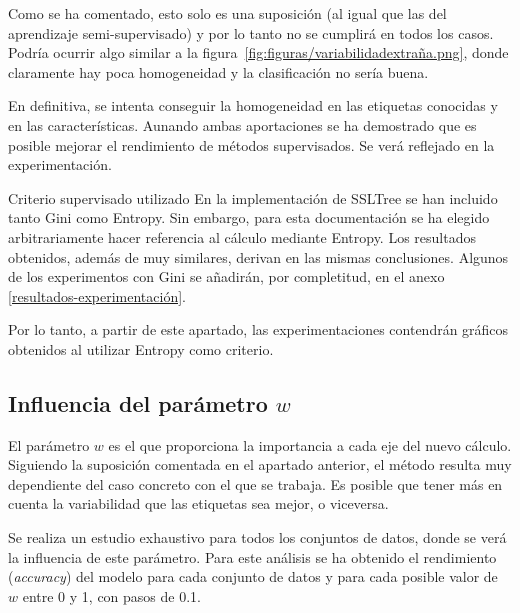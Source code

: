 Como se ha comentado, esto solo es una suposición (al igual que las del aprendizaje semi-supervisado) y por lo tanto no se cumplirá en todos los casos. Podría ocurrir algo similar a la figura~\ref{fig:figuras/variabilidadextraña.png}, donde claramente hay poca homogeneidad y la clasificación no sería buena.


En definitiva, se intenta conseguir la homogeneidad en las etiquetas conocidas y en las características. Aunando ambas aportaciones se ha demostrado que es posible mejorar el rendimiento de métodos supervisados. Se verá reflejado en la experimentación.

\begin{mainbox}{Criterio supervisado utilizado}
    En la implementación de SSLTree se han incluido tanto Gini como Entropy. Sin embargo, para esta documentación se ha elegido arbitrariamente hacer referencia al cálculo mediante Entropy. Los resultados obtenidos, además de muy similares, derivan en las mismas conclusiones. Algunos de los experimentos con Gini se añadirán, por completitud, en el anexo \ref{resultados-experimentación}.

    Por lo tanto, a partir de este apartado, las experimentaciones contendrán gráficos obtenidos al utilizar Entropy como criterio.
\end{mainbox}

\subsection{Influencia del parámetro $w$}

El parámetro $w$ es el que proporciona la importancia a cada eje del nuevo cálculo. Siguiendo la suposición comentada en el apartado anterior, el método resulta muy dependiente del caso concreto con el que se trabaja. Es posible que tener más en cuenta la variabilidad que las etiquetas sea mejor, o viceversa.

Se realiza un estudio exhaustivo para todos los conjuntos de datos, donde se verá la influencia de este parámetro. Para este análisis se ha obtenido el rendimiento (\textit{accuracy}) del modelo para cada conjunto de datos y para cada posible valor de $w$ entre 0 y 1, con pasos de 0.1.\newline


